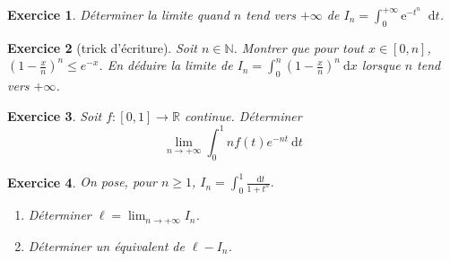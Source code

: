\documentclass[12pt,a4paper]{article}
\newcommand{\E}{\mathrm{e}}
\newcommand{\diff}{\mathop{}\mathopen{}\mathrm{d}}%
{%
\theoremstyle{break}
\theoremprework{%
\rule{0.5\linewidth}{0.3pt}}
\theorempostwork{\hfill%
\rule{0.5\linewidth}{0.3pt}}
\theoremheaderfont{\scshape}
\theoremseparator{ ---}
\newtheorem{Prop}{%
\textcolor{blue}{Proposition}}[section]
}
\theoremstyle{break}
\newtheorem{Exo}{Exercice}
\begin{document}
%	
%	

\begin{Exo}
	Déterminer la limite quand $n$ tend vers $+\infty$ de $I_n=\int_0^{+\infty}\E^{-t^n}\diff t$.
\end{Exo}

\begin{Exo}[trick d'écriture]
	Soit $n \in \mathbb{N}$. Montrer que pour tout $x \in[0, n]$,
	$
	\left(1-\frac{x}{n}\right)^{n} \leqslant e^{-x}
	$. 
	En déduire la limite de $I_n=\int_{0}^{n}\left(1-\frac{x}{n}\right)^{n} \mathrm{~d} x$ lorsque $n$ tend vers $+\infty$.
\end{Exo}

\begin{Exo}
	Soit $f:[0,1] \rightarrow \mathbb{R}$ continue. Déterminer
	$$
	\lim _{n \rightarrow+\infty} \int_{0}^{1} n f(t) e^{-n t} \mathrm{~d} t
	$$
\end{Exo}







\begin{Exo}
	On pose, pour $n\geq 1$, 
$I_n=\int_0^1 \frac{\diff t}{1+t^n}.$
\begin{enumerate}
	\item Déterminer $\ell=\lim_{n\to+\infty}I_n$.
	\item Déterminer un équivalent de $\ell-I_n$.
\end{enumerate}
\end{Exo}
\end{document}
